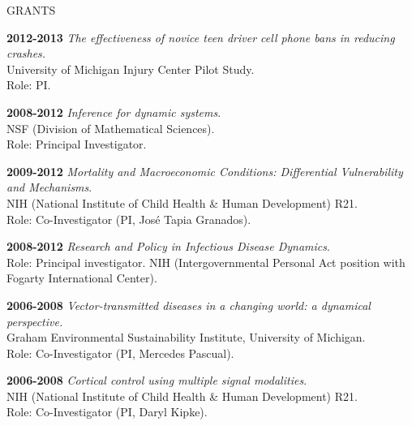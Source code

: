 \begin{mylist} {GRANTS}
\item {\bf 2012-2013 } {\em The effectiveness of novice teen driver cell phone bans in reducing crashes.}\\
  University of Michigan Injury Center Pilot Study.
  \\
  Role: PI.

\item{\bf 2008-2012 } {\em Inference for dynamic systems}.\\
  NSF (Division of Mathematical Sciences).
  \\
  Role: Principal Investigator.

\item{\bf 2009-2012 } {\em Mortality and Macroeconomic Conditions: Differential Vulnerability and Mechanisms}.\\
  NIH (National Institute of Child Health \& Human Development) R21.
  \\
  Role: Co-Investigator (PI, Jos\'{e} Tapia Granados).

\item{\bf 2008-2012 } {\em Research and Policy in Infectious Disease Dynamics}.\\
Role: Principal investigator.
NIH (Intergovernmental Personal Act position with Fogarty International Center).

\item{\bf 2006-2008 } {\em Vector-transmitted diseases in a changing world: a dynamical perspective.}\\
  Graham Environmental Sustainability Institute, University of Michigan.
  \\
  Role: Co-Investigator (PI, Mercedes Pascual).

\item{\bf 2006-2008 } {\em Cortical control using multiple signal modalities}.\\
  NIH (National Institute of Child Health \& Human Development) R21.
  \\
  Role: Co-Investigator (PI, Daryl Kipke).


\end{mylist}
